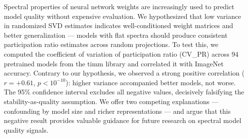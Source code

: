 Spectral properties of neural network weights are increasingly used to predict model quality without expensive evaluation. We hypothesized that low variance in randomized SVD estimates indicates well-conditioned weight matrices and better generalization --- models with flat spectra should produce consistent participation ratio estimates across random projections. To test this, we computed the coefficient of variation of participation ratio (CV\_PR) across 94 pretrained models from the timm library and correlated it with ImageNet accuracy. Contrary to our hypothesis, we observed a strong positive correlation ($r = +0.61$, $p < 10^{-10}$): higher variance accompanied better models, not worse. The 95\% confidence interval excludes all negative values, decisively falsifying the stability-as-quality assumption. We offer two competing explanations --- confounding by model size and richer representations --- and argue that this negative result provides valuable guidance for future research on spectral model quality signals.

